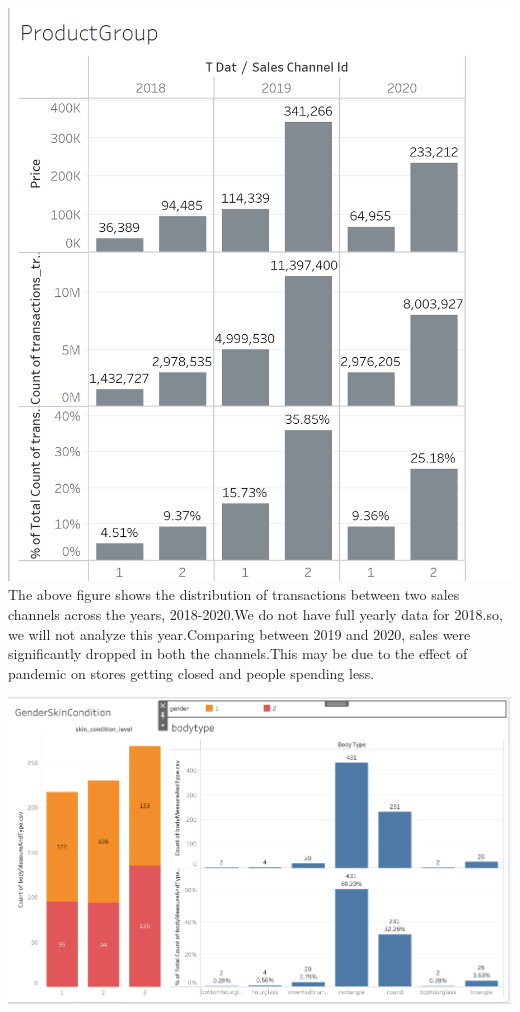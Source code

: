 \documentclass[11pt,journal,compsoc]{IEEEtran}
\begin{document}
\includegraphics[scale=0.35]{images/date.png}
\newline {}\\
\justifying The above figure shows the distribution of transactions between two sales channels across the years, 2018-2020.We do not have full yearly data for 2018.so, we will not analyze this year.Comparing between 2019 and 2020, sales were significantly dropped in both the channels.This may be due to the  effect of pandemic on stores getting closed and people spending less.\

\includegraphics[scale=0.2]{images/skin.png}
\newline {}\\
\
\end{document}
